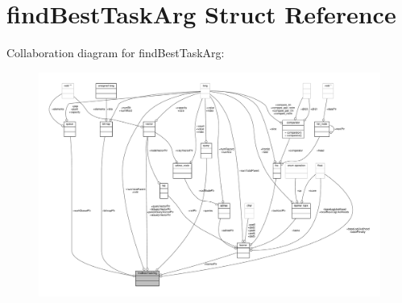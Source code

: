 \hypertarget{structfindBestTaskArg}{\section{find\-Best\-Task\-Arg Struct Reference}
\label{structfindBestTaskArg}
}


Collaboration diagram for find\-Best\-Task\-Arg\-:
\nopagebreak
\begin{figure}[H]
\begin{center}
\leavevmode
\includegraphics[width=350pt]{structfindBestTaskArg__coll__graph}
\end{center}
\end{figure}
